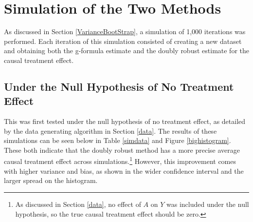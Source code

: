 \section{Simulation of the Two Methods} 
As discussed in Section \ref{VarianceBootStrap}, a simulation of 1,000 iterations was performed.  Each iteration of this simulation consisted of creating a new dataset and obtaining both the g-formula estimate and the doubly robust estimate for the causal treatment effect.  

\subsection{Under the Null Hypothesis of No Treatment Effect} 
This was first tested under the null hypothesis of no treatment effect, as detailed by the data generating algorithm in Section \ref{data}.  The results of these simulations can be seen below in Table \ref{simdata} and Figure \ref{bighistogram}.  These both indicate that the doubly robust method has a more precise average causal treatment effect across simulations.\footnote{As discussed in Section \ref{data}, no effect of $A$ on $Y$ was included under the null hypothesis, so the true causal treatment effect should be zero.}  However, this improvement comes with higher variance and bias, as shown in the wider confidence interval and the larger spread on the histogram.


